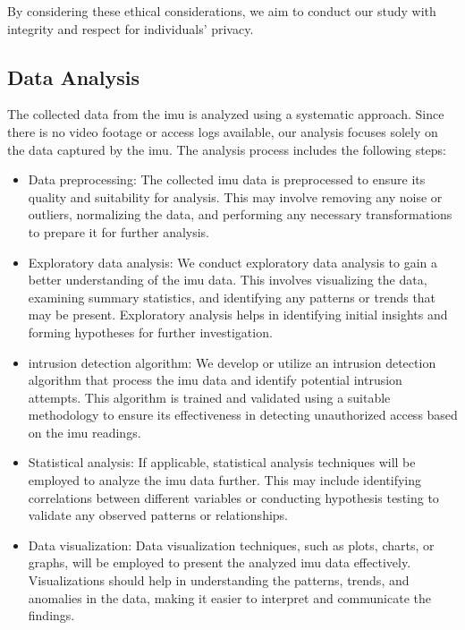 \documentclass[../main.tex]{subfiles}
\begin{document}
    By considering these ethical considerations,
    we aim to conduct our study with integrity and respect for individuals' privacy.

    \subsection{Data Analysis}

    The collected data from the \gls{imu} is analyzed using a systematic approach.
    Since there is no video footage or access logs available,
    our analysis focuses solely on the data captured by the \gls{imu}.
    The analysis process includes the following steps:
    
    \begin{itemize}
    \item Data preprocessing: The collected \gls{imu} data is preprocessed to ensure its quality and suitability for analysis. This may involve removing any noise or outliers, normalizing the data, and performing any necessary transformations to prepare it for further analysis.
    \item Exploratory data analysis: We conduct exploratory data analysis to gain a better understanding of the \gls{imu} data. This involves visualizing the data, examining summary statistics, and identifying any patterns or trends that may be present. Exploratory analysis helps in identifying initial insights and forming hypotheses for further investigation.

    \item \gls{intrusion} detection algorithm: We develop or utilize an \gls{intrusion} detection algorithm that process the \gls{imu} data and identify potential \gls{intrusion} attempts. This algorithm is trained and validated using a suitable methodology to ensure its effectiveness in detecting unauthorized access based on the \gls{imu} readings.

    \item Statistical analysis: If applicable, statistical analysis techniques will be employed to analyze the \gls{imu} data further. This may include identifying correlations between different variables or conducting hypothesis testing to validate any observed patterns or relationships.

    \item Data visualization: Data visualization techniques, such as plots, charts, or graphs, will be employed to present the analyzed \gls{imu} data effectively. Visualizations should help in understanding the patterns, trends, and anomalies in the data, making it easier to interpret and communicate the findings.
    
    \end{itemize}
\end{document}
